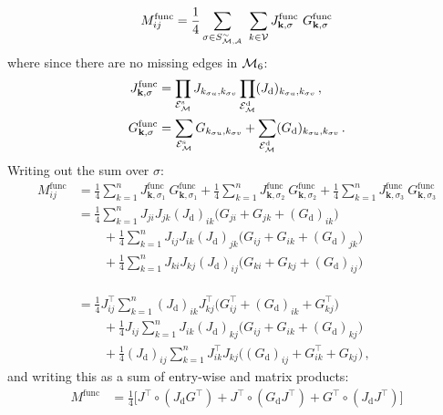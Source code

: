 \begin{example}
$$
M^\mathrm{func}_{ij} = \frac{1}{4} \sum_{\sigma \in S_{\mathcal{M,A}}^\sim} \ \sum_{k \in \mathcal{V}} J^\mathrm{func}_{\mathbf{k},\sigma} \ G^\mathrm{func}_{\mathbf{k},\sigma}
$$
%
where since there are no missing edges in $\mathcal{M}_6$:
%
\begin{align*}
%
	J^\mathrm{func}_{\mathbf{k},\sigma}
	&= \prod_{\ca{E}_\ca{M}^\mathrm{s}} J_{k_{\sigma u},k_{\sigma v}}
	\prod_{\ca{E}_\ca{M}^\mathrm{d}} (J_\mathrm{d})_{k_{\sigma u},k_{\sigma v}}\,, \\
%
	G^\mathrm{func}_{\mathbf{k},\sigma}
	&= \sum_{\ca{E}_\ca{M}^\mathrm{s}} G_{k_{\sigma u},k_{\sigma v}}
	+ \sum_{\ca{E}_\ca{M}^\mathrm{d}} (G_\mathrm{d})_{k_{\sigma u},k_{\sigma v}}\,.
%
\end{align*}
%
Writing out the sum over $\sigma$:
%
\begingroup
\allowdisplaybreaks
\begin{align*}
	M^\mathrm{func}_{ij}
	&= \frac{1}{4} \sum_{k=1}^n J^\mathrm{func}_{\mathbf{k},\sigma_1} \ G^\mathrm{func}_{\mathbf{k},\sigma_1} + \frac{1}{4} \sum_{k=1}^n J^\mathrm{func}_{\mathbf{k},\sigma_2} \ G^\mathrm{func}_{\mathbf{k},\sigma_2} + \frac{1}{4} \sum_{k=1}^n J^\mathrm{func}_{\mathbf{k},\sigma_3} \ G^\mathrm{func}_{\mathbf{k},\sigma_3} \\
%
	&=         \frac{1}{4} \sum_{k=1}^n J_{ji} J_{jk} (J_\mathrm{d})_{ik} \big(G_{ji} + G_{jk} + (G_\mathrm{d})_{ik}\big) \\
	& \qquad + \frac{1}{4} \sum_{k=1}^n J_{ij} J_{ik} (J_\mathrm{d})_{jk} \big(G_{ij} + G_{ik} + (G_\mathrm{d})_{jk}\big) \\
	& \qquad + \frac{1}{4} \sum_{k=1}^n J_{ki} J_{kj} (J_\mathrm{d})_{ij} \big(G_{ki} + G_{kj} + (G_\mathrm{d})_{ij}\big) \\
%
	& \\
	& \\
	& \\
&=         \frac{1}{4} J^\top_{ij}         \sum_{k=1}^n (J_\mathrm{d})_{ik} J^\top_{kj} \big(G^\top_{ij} + (G_\mathrm{d})_{ik} + G^\top_{kj}\big) \\
& \qquad + \frac{1}{4} J_{ij}              \sum_{k=1}^n J_{ik} (J_\mathrm{d})_{kj}      \big(G_{ij} + G_{ik} + (G_\mathrm{d})_{kj}\big) \\
& \qquad + \frac{1}{4} (J_\mathrm{d})_{ij} \sum_{k=1}^n J^\top_{ik} J_{kj}              \big((G_\mathrm{d})_{ij} + G^\top_{ik} + G_{kj}\big) \,,
\end{align*}
\endgroup
%
and writing this as a sum of entry-wise and matrix products:
%
\begin{align*}
M^\textrm{func} &= \frac{1}{4} \Big[ J^\top \circ (J_\mathrm{d} G^\top) + J^\top \circ (G_\mathrm{d} J^\top) + G^\top \circ (J_\mathrm{d} J^\top) \Big] \\

\end{align*}
\end{example}

